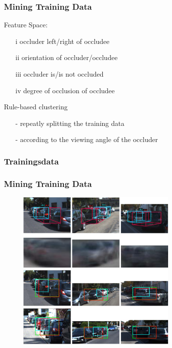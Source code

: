 \documentclass[xcolor=dvipsnames]{beamer}
\begin{document}
\begin{frame}
	\frametitle{Mining Training Data}
	\Large
	Feature Space: \\
	\begin{itemize}
		\item[i]   occluder left/right of occludee
		\item[ii]  orientation of occluder/occludee
		\item[iii] occluder is/is not occluded
		\item[iv] degree of occlusion of occludee
 	\end{itemize}
 	\vspace{1cm}
 	Rule-based clustering
 	\begin{itemize}
	 	\item[-] repeatly splitting the training data
	 	\item[-] according to the viewing angle of the occluder
 	\end{itemize}
\end{frame}

\subsubsection{Trainingsdata}
\begin{frame}
	\frametitle{Mining Training Data}
	\begin{figure}
	\includegraphics[width=0.7\textwidth]{img/dpmoc_2.png}
	\end{figure}
\end{frame}
\end{document}
